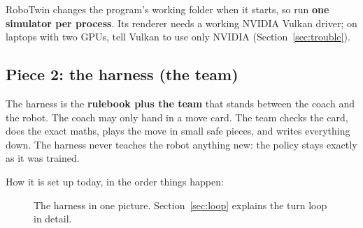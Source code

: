 \documentclass[11pt,a4paper]{article}
\newcommand{\code}[1]{\texttt{\detokenize{#1}}}
\begin{document}
\begin{careful}
RoboTwin changes the program's working folder when it starts, so run \textbf{one simulator per
process}. Its renderer needs a working NVIDIA Vulkan driver; on laptops with two GPUs, tell Vulkan
to use only NVIDIA (Section~\ref{sec:trouble}).
\end{careful}

\subsection{Piece 2: the harness (the team)}

\begin{eli5}
The harness is the \textbf{rulebook plus the team} that stands between the coach and the robot.
The coach may only hand in a move card. The team checks the card, does the exact maths, plays the
move in small safe pieces, and writes everything down. The harness never teaches the robot
anything new: the policy stays exactly as it was trained.
\end{eli5}

How it is set up today, in the order things happen:

\begin{figure}[H]
\centering
{}
\caption{The harness in one picture. Section~\ref{sec:loop} explains the turn loop in detail.}
\end{figure}
\end{document}
